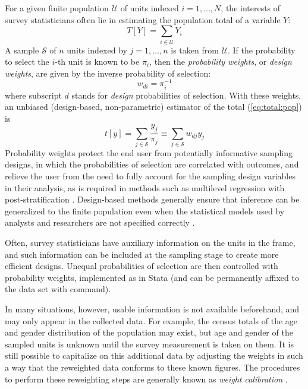 For a given finite population $\mathcal U$ of units indexed $i=1,\ldots,N$,
the interests of survey statisticians often lie in estimating the
population total of a variable $Y$:
\begin{equation}
   T[Y] = \sum_{i \in \mathcal{U}} Y_i
   \label{eq:total:pop}
\end{equation}
A sample $\mathcal S$ of $n$ units indexed by $j=1,\ldots,n$
is taken from $\mathcal U$. If the probability to select the
$i$-th unit is known to be $\pi_i$, then
the {\it probability weights}, or {\it design weights}, are given by
the inverse probability of selection:
\begin{equation}
   w_{di} = \pi_i^{-1}
   \label{eq:prob:weight}
\end{equation}
where subscript $d$ stands for \textit{design} probabilities of selection.
With these weights, an unbiased
(design-based, non-parametric) estimator
of the total (\ref{eq:total:pop}) is \citep{horvitz:thompson:1952}
\begin{equation}
   t[y] = \sum_{j \in \mathcal{S}} \frac{y_j}{\pi_j}
   \equiv \sum_{j \in \mathcal{S}} w_{dj} y_j
   \label{eq:total:sample}
\end{equation}
Probability weights protect
the end user from potentially informative sampling designs, in which
the probabilities of selection are correlated with outcomes, and
relieve the user from the need to fully account for the sampling design
variables in their analysis, as is required in methods such
as multilevel regression with post-stratification \citep{park:gelman:bafumi:2004}.
Design-based methods generally ensure that inference can be generalized
to the finite population even when the statistical models used
by analysts and researchers are not specified correctly
\citep{pfeff:1993,binder:roberts:2003}.

Often, survey statisticians have auxiliary information on the units
in the frame, and such information can be included at the sampling stage
to create more efficient designs. Unequal probabilities of selection
are then controlled with probability weights, implemented
as \stcmd{[pw=}{\it exp}\stcmd{]} in Stata (and can be permanently
affixed to the data set with  command).

In many situations, however, usable information is not available beforehand,
and may only appear in the collected data. For example, the census totals of the age and gender
distribution of the population may exist, but age and gender of
the sampled units is unknown until the survey measurement is taken on them.
It is still possible to capitalize on this additional data by
adjusting the weights in such a way that the reweighted data
conforms to these known figures. The procedures to perform these
reweighting steps are generally known as {\it weight calibration}
\citep{deville:sarndal:1992,deville:sarndal:sautory:1993,%
kott:2006,kott:2009,sarndal:2007}.


